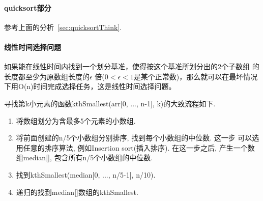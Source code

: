 \paragraph{quicksort部分}
参考上面的分析~\ref{sec:quicksortThink}.

\paragraph{线性时间选择问题}
如果能在线性时间内找到一个划分基准，使得按这个基准所划分出的2个子数组
的长度都至少为原数组长度的$\epsilon$ 倍($0<\epsilon <1$是某个正常数)，那么就可以在最坏情况
下用O(n)时间完成选择任务，这是线性时间选择问题。\par
寻找第k小元素的函数kthSmallest(arr[0, ..., n-1], k)的大致流程如下.
\begin{enumerate}
	\item 将数组划分为含最多5个元素的小数组.
	\item 将前面创建的n/5个小数组分别排序, 找到每个小数组的中位数. 这一步
	      可以选用任意的排序算法, 例如Insertion sort(插入排序). 在这一步之后,
	      产生一个数组median[], 包含所有n/5个小数组的中位数.
	\item 找到kthSmallest(median[0, ..., n/5-1], n/10).
	\item 递归的找到median[]数组的kthSmallest.
\end{enumerate}

